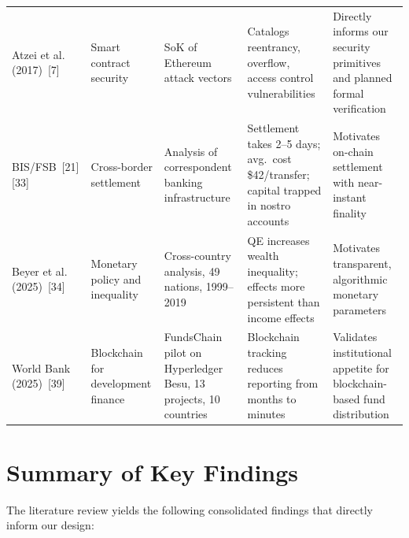 \documentclass[12pt,a4paper]{report}
\begin{document}
\begin{longtable}{@{} p{2.2cm} p{2.2cm} p{2.5cm} p{2.8cm} p{2.8cm} @{}}
\rowcolor{RowShade}
Atzei et al. (2017)~[7] & Smart contract security & SoK of Ethereum attack vectors & Catalogs reentrancy, overflow, access control vulnerabilities & Directly informs our security primitives and planned formal verification \\
BIS/FSB~[21][33] & Cross-border settlement & Analysis of correspondent banking infrastructure & Settlement takes 2--5 days; avg.\ cost \$42/transfer; capital trapped in nostro accounts & Motivates on-chain settlement with near-instant finality \\
\rowcolor{RowShade}
Beyer et al. (2025)~[34] & Monetary policy and inequality & Cross-country analysis, 49 nations, 1999--2019 & QE increases wealth inequality; effects more persistent than income effects & Motivates transparent, algorithmic monetary parameters \\
World Bank (2025)~[39] & Blockchain for development finance & FundsChain pilot on Hyperledger Besu, 13 projects, 10 countries & Blockchain tracking reduces reporting from months to minutes & Validates institutional appetite for blockchain-based fund distribution \\
\end{longtable}


\section{Summary of Key Findings}

The literature review yields the following consolidated findings that directly inform our design:
\end{document}

